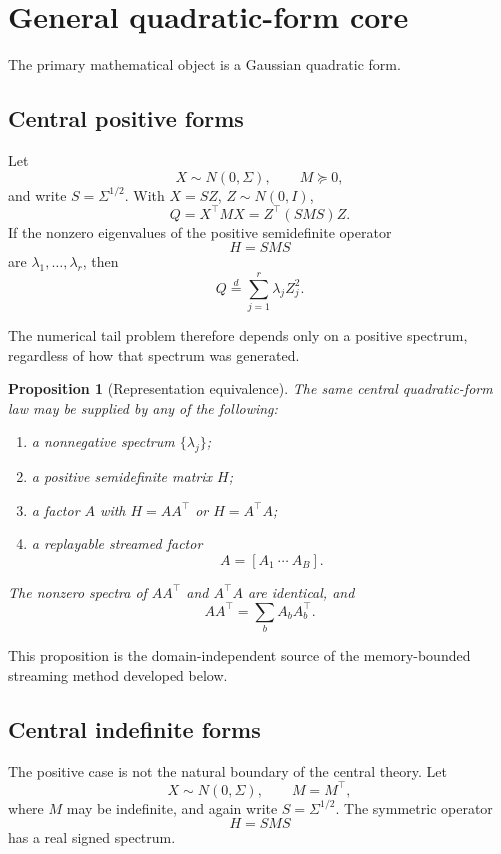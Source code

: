 \documentclass[11pt]{article}
\newtheorem{proposition}[theorem]{Proposition}
\theoremstyle{definition}
\theoremstyle{remark}
\begin{document}
\section{General quadratic-form core}\label{sec:gaussian-core}

The primary mathematical object is a Gaussian quadratic form.

\subsection{Central positive forms}

Let
\[
X\sim N(0,\Sigma),
\qquad
M\succeq0,
\]
and write \(S=\Sigma^{1/2}\).  With \(X=SZ\), \(Z\sim N(0,I)\),
\[
Q=X^\top MX
=
Z^\top(SMS)Z.
\]
If the nonzero eigenvalues of the positive semidefinite operator
\[
H=SMS
\]
are \(\lambda_1,\ldots,\lambda_r\), then
\[
\boxed{
Q\overset d=
\sum_{j=1}^r\lambda_jZ_j^2.
}
\]

The numerical tail problem therefore depends only on a positive spectrum,
regardless of how that spectrum was generated.

\begin{proposition}[Representation equivalence]\label{claim:final-2-1}
The same central quadratic-form law may be supplied by any of the following:
\begin{enumerate}
\item a nonnegative spectrum \(\{\lambda_j\}\);
\item a positive semidefinite matrix \(H\);
\item a factor \(A\) with \(H=AA^\top\) or \(H=A^\top A\);
\item a replayable streamed factor
\[
A=[A_1\ \cdots\ A_B].
\]
\end{enumerate}
The nonzero spectra of \(AA^\top\) and \(A^\top A\) are identical, and
\[
AA^\top=\sum_bA_bA_b^\top.
\]
\end{proposition}

This proposition is the domain-independent source of the memory-bounded
streaming method developed below.

\subsection{Central indefinite forms}

The positive case is not the natural boundary of the central theory.  Let
\[
X\sim N(0,\Sigma),
\qquad
M=M^\top,
\]
where $M$ may be indefinite, and again write $S=\Sigma^{1/2}$.  The symmetric
operator
\[
H=SMS
\]
has a real signed spectrum.
\end{document}
